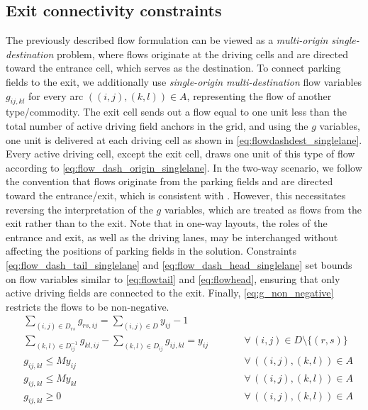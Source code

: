 \documentclass[10pt]{article}
\newcommand{\drivevar}[2]{y_{#1#2}}
\newcommand{\flowvardash}[4]{g_{#1#2,#3#4}}
\newcommand{\validdriveset}{D}
\newcommand{\gridadjset}[2]{D_{#1#2}}
\newcommand{\gridinvadjset}[2]{D^{-1}_{#1#2}}
\newcommand{\gridarcset}{A}
\newcommand{\exitset}{\{(\exitx, \exity)\}}
\newcommand{\exitx}{r}
\newcommand{\exity}{s}
\theoremstyle{definition}
\begin{document}
\subsection{Exit connectivity constraints}
The previously described flow formulation can be viewed as a \textit{multi-origin single-destination} problem, where flows originate at the driving cells and are directed toward the entrance cell, which serves as the destination. To connect parking fields to the exit, we additionally use \textit{single-origin multi-destination} flow variables $\flowvardash{i}{j}{k}{l}$ for every arc $((i,j),(k,l)) \in \gridarcset$, representing the flow of another type/commodity. The exit cell sends out a flow equal to one unit less than the total number of active driving field anchors in the grid, and using the $g$ variables, one unit is delivered at each driving cell as shown in \eqref{eq:flowdashdest_singlelane}. Every active driving cell, except the exit cell, draws one unit of this type of flow according to \eqref{eq:flow_dash_origin_singlelane}. In the two-way scenario, we follow the convention that flows originate from the parking fields and are directed toward the entrance/exit, which is consistent with \cite{stephan2021layout}. However, this necessitates reversing the interpretation of the $g$ variables, which are treated as flows from the exit rather than to the exit. Note that in one-way layouts, the roles of the entrance and exit, as well as the driving lanes, may be interchanged without affecting the positions of parking fields in the solution. Constraints \eqref{eq:flow_dash_tail_singlelane} and \eqref{eq:flow_dash_head_singlelane} set bounds on flow variables similar to \eqref{eq:flowtail} and \eqref{eq:flowhead}, ensuring that only active driving fields are connected to the exit. Finally, \eqref{eq:g_non_negative} restricts the flows to be non-negative.
\begin{align}
& \sum_{(i,j) \in \gridadjset{\exitx}{\exity}} \flowvardash{\exitx}{\exity}{i}{j} = \sum_{(i,j) \in \validdriveset} \drivevar{i}{j}  - 1 \qquad && \label{eq:flowdashdest_singlelane}\\
    & \sum_{(k,l) \in \gridinvadjset{i}{j}} \flowvardash{k}{l}{i}{j} - \sum_{(k,l) \in \gridadjset{i}{j}} \flowvardash{i}{j}{k}{l} = \drivevar{i}{j}  \qquad && \forall \, (i,j) \in \validdriveset \setminus \exitset \label{eq:flow_dash_origin_singlelane}\\
    & \flowvardash{i}{j}{k}{l} \leq M \drivevar{i}{j}  \qquad && \forall \, ((i,j), (k,l)) \in \gridarcset \label{eq:flow_dash_tail_singlelane}\\
    & \flowvardash{i}{j}{k}{l} \leq M \drivevar{k}{l}  \qquad && \forall \, ((i,j), (k,l)) \in \gridarcset \label{eq:flow_dash_head_singlelane}\\
    & \flowvardash{i}{j}{k}{l} \geq 0 \qquad && \forall \, ((i,j), (k,l)) \label{eq:g_non_negative}\in \gridarcset
\end{align}
\end{document}
